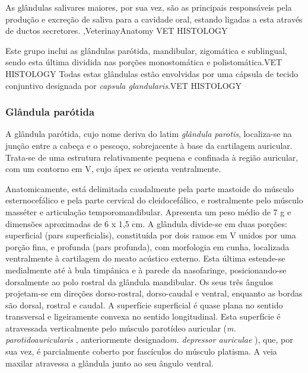 As glândulas salivares maiores, por sua vez, são as principais responsáveis pela produção e excreção de saliva para a cavidade oral, estando ligadas a esta através de ductos secretores. \cite{Singh2017},VeterinayAnatomy VET HISTOLOGY 

Este grupo inclui as glândulas parótida, mandibular, zigomática e sublingual, sendo esta última dividida nas porções monostomática e polistomática.VET HISTOLOGY Todas estas glândulas estão envolvidas por uma cápsula de tecido conjuntivo designada por \textit{capsula glandularis}.VET HISTOLOGY

\subsubsection{Glândula parótida}

A glândula parótida, cujo nome deriva do latim \textit{glândula parotis}, localiza-se na junção entre a cabeça e o pescoço, sobrejacente  à base da cartilagem auricular. Trata-se de uma estrutura relativamente pequena e confinada à região auricular, com um contorno em V, cujo ápex se orienta ventralmente.\cite{Singh2017}

Anatomicamente, está delimitada caudalmente pela parte mastoide do músculo esternocefálico e pela parte cervical do cleidocefálico, e rostralmente pelo músculo masséter e articulação temporomandibular.\cite{Singh2017} Apresenta um peso médio de 7 g e dimensões aproximadas de 6 x 1,5 cm.\cite{Singh2017}
A glândula divide-se em duas porções: superficial (pars superficialis), constituída por dois ramos em V unidos por uma porção fina, e profunda (pars profunda), com morfologia em cunha, localizada ventralmente à cartilagem do meato acústico externo.\cite{Singh2017} Esta última estende-se medialmente até à bula timpânica e à parede da nasofaringe, posicionando-se dorsalmente ao polo rostral da glândula mandibular.\cite{Singh2017}
Os seus três ângulos projetam-se em direções dorso-rostral, dorso-caudal e ventral, enquanto as bordas são dorsal, rostral e caudal.\cite{Singh2017} A superfície superficial  é quase plana no sentido transversal e ligeiramente convexa no sentido longitudinal.\cite{Singh2017} Esta superfície é atravessada verticalmente pelo músculo parotídeo auricular (\textit{m. parotidoauricularis} , anteriormente designado\textit{m. depressor auriculae} ), que, por sua vez, é parcialmente coberto por fascículos do músculo platisma.\cite{Singh2017} A veia maxilar atravessa a glândula junto ao seu ângulo ventral.\cite{Singh2017}


